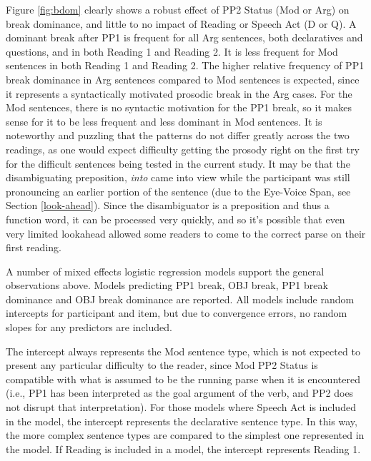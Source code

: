 \documentclass[11pt,oneside]{book}
\begin{document}
Figure \ref{fig:bdom} clearly shows a robust effect of PP2 Status (Mod or Arg) on break dominance, and little to no impact of Reading or Speech Act (D or Q). A dominant break after PP1 is frequent for all Arg sentences, both declaratives and questions, and in both Reading 1 and Reading 2. It is less frequent for Mod sentences in both Reading 1 and Reading 2. The higher relative frequency of PP1 break dominance in Arg sentences compared to Mod sentences is expected, since it represents a syntactically motivated prosodic break in the Arg cases. For the Mod sentences, there is no syntactic motivation for the PP1 break, so it makes sense for it to be less frequent and less dominant in Mod sentences.
It is noteworthy and puzzling that the patterns do not differ greatly across the two readings, as one would expect difficulty getting the prosody right on the first try for the difficult sentences being tested in the current study. It may be that the disambiguating preposition, \emph{into} came into view while the participant was still pronouncing an earlier portion of the sentence (due to the Eye-Voice Span, see Section \ref{look-ahead}). Since the disambiguator is a preposition and thus a function word, it can be processed very quickly, and so it's possible that even very limited lookahead allowed some readers to come to the correct parse on their first reading.

A number of mixed effects logistic regression models support the general observations above. Models predicting PP1 break, OBJ break, PP1 break dominance and OBJ break dominance are reported. All models include random intercepts for participant and item, but due to convergence errors, no random slopes for any predictors are included.

The intercept always represents the Mod sentence type, which is not expected to present any particular difficulty to the reader, since Mod PP2 Status is compatible with what is assumed to be the running parse when it is encountered (i.e., PP1 has been interpreted as the goal argument of the verb, and PP2 does not disrupt that interpretation). For those models where Speech Act is included in the model, the intercept represents the declarative sentence type. In this way, the more complex sentence types are compared to the simplest one represented in the model. If Reading is included in a model, the intercept represents Reading 1.
\end{document}
